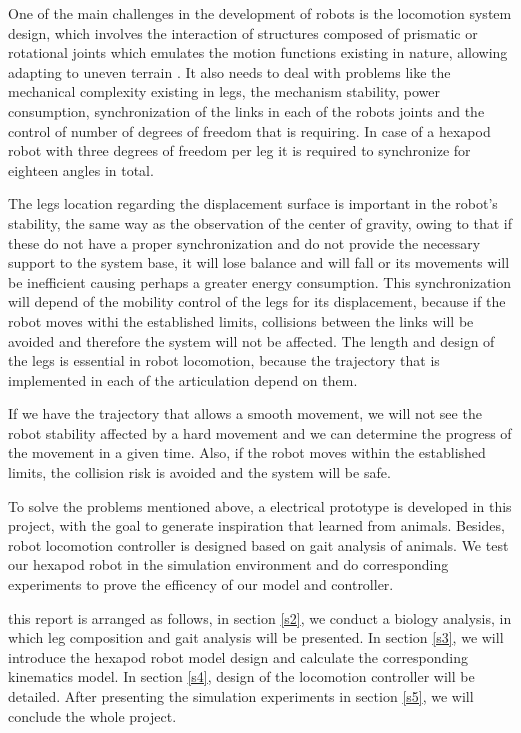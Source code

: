 \documentclass[conference]{IEEEtran}
\begin{document}
One of the main challenges in the development of robots is the locomotion system design, which involves the interaction of structures composed of prismatic or rotational joints which emulates the motion functions existing in nature, allowing adapting to uneven terrain \cite{a15}. It also needs to deal with problems like the mechanical complexity existing in legs, the mechanism stability, power consumption, synchronization of the links in each of the robots joints and the control of number of degrees of freedom that is requiring.\cite{aa} In case of a hexapod robot with three degrees of freedom per leg it is required to synchronize for eighteen angles in total.

The legs location regarding the displacement surface is important in the robot’s stability, the same way as the observation of the center of gravity, owing to that if these do not have a proper synchronization and do not provide the necessary support to the system base, it will lose balance and will fall or its movements will be inefficient causing perhaps a greater energy consumption\cite{a16}. This synchronization will depend of the mobility control of the legs for its displacement, because if the robot moves withi the established limits, collisions between the links will be avoided and therefore the system will not be affected. The length and design of the legs is essential in robot locomotion, because the trajectory that is implemented in each of the articulation depend on them.

If we have the trajectory that allows a smooth movement, we will not see the robot stability affected by a hard movement and we can determine the progress of the movement in a given time. Also, if the robot moves within the established limits, the collision risk is avoided and the system will be safe.

To solve the problems mentioned above, a electrical prototype is developed in this project, with the goal to generate inspiration that learned from animals. Besides, robot locomotion controller is designed based on gait analysis of animals. We test our hexapod robot in the simulation environment and do corresponding experiments to prove the efficency of our model and controller. 

this report is arranged as follows, in section \ref{s2}, we conduct a biology analysis, in which leg composition and gait analysis will be presented. In section \ref{s3}, we will introduce the hexapod robot model design and calculate the corresponding kinematics model. In section \ref{s4}, design of the locomotion controller will be detailed. After presenting the simulation experiments in section \ref{s5}, we will conclude the whole project.
\end{document}
